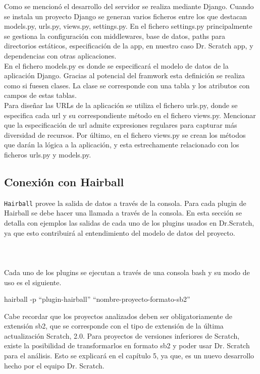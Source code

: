 \documentclass[a4paper, 12pt]{book}
\begin{document}
Como se mencionó el desarrollo del servidor se realiza mediante Django. Cuando se instala un proyecto
Django se generan varios ficheros entre los que destacan models.py, urls.py, views.py, settings.py.
En el fichero settings.py principalmente se gestiona la configuración con middlewares, base de datos,
paths para directorios estáticos, especificación de la app, en nuestro caso Dr. Scratch app, y 
dependencias con otras aplicaciones. \\

En el fichero models.py es donde se especificará el modelo de datos de la aplicación Django. Gracias 
al potencial del framwork esta definición se realiza como si fuesen clases. La clase se corresponde 
con una tabla y los atributos con campos de estas tablas. \\

Para diseñar las URLs de la aplicación se utiliza el fichero urls.py, donde se especifica cada url y
su correspondiente método en el fichero views.py. Mencionar que la especificación de url admite 
expresiones regulares para capturar más diversidad de recursos.
Por último, en el fichero views.py se crean los métodos que darán la lógica a la aplicación, y esta
estrechamente relacionado con los ficheros urls.py y models.py.


\subsection{Conexión con Hairball}
\texttt{Hairball} provee la salida de datos a través de la consola. Para cada plugin de Hairball se 
debe hacer una llamada a través de la consola. En esta sección se detalla con ejemplos las salidas 
de cada uno de los plugins usados en Dr.Scratch, ya que esto contribuirá al entendimiento del modelo 
de datos del proyecto. \\ \\ \\ \\

Cada uno de los plugins se ejecutan a través de una consola bash y su modo de uso es el siguiente.

\begin{center}
hairball -p "`plugin-hairball"' "`nombre-proyecto-formato-sb2"'
\end{center}

Cabe recordar que los proyectos analizados deben ser obligatoriamente de extensión sb2, que se 
corresponde con el tipo de extensión de la última actualización Scratch, 2.0. Para proyectos de 
versiones inferiores de Scratch, existe la posibilidad de transformarlos en formato sb2 y poder
usar Dr. Scratch para el análisis. Esto se explicará en el capítulo 5, ya que, es un nuevo
desarrollo hecho por el equipo Dr. Scratch. \\
\end{document}
